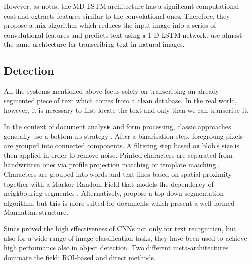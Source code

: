 		However, as \citet{MDLSTM_vs_CNN} notes, the MD-LSTM architecture has a significant computational cost and extracts features similar to the convolutional ones. Therefore, they propose a mix algorithm which reduces the input image into a series of convolutional features and predicts text using a 1-D LSTM network.  use almost the same archtecture for transcribing text in natural images.


	\subsection{Detection}

		All the systems mentioned above focus solely on transcribing an already-segmented piece of text which comes from a clean database. In the real world, however, it is necessary to first locate the text and only then we can transcribe it.


		In the context of document analysis and form processing, classic approaches generally use a bottom-up strategy \citep{bottom_up}. After a binarisation step, foregroung pixels are grouped into connected components. A filtering step based on blob's size is then applied in order to remove noise. Printed characters are separated from handwritten ones via profile projection matching \citep{profile_matching,moysset2014a2ia} or template matching \citep{template_matching}. Characters are grouped into words and text lines based on spatial proximity together with a Markov Random Field that models the dependency of neighbouring segmentes \citep{detection_mrf,detection_mrf2}. Alternatively, \citet{top_down} propose a top-down segmentation algorithm, but this is more suited for documents which present a well-formed Manhattan structure.


		Since \citet{ciresan} proved the high effectiveness of CNNs not only for text recognition, but also for a wide range of image classification tasks, they have been used to achieve high performance also in object detection. Two different meta-architectures dominate the field: ROI-based and direct methods.

